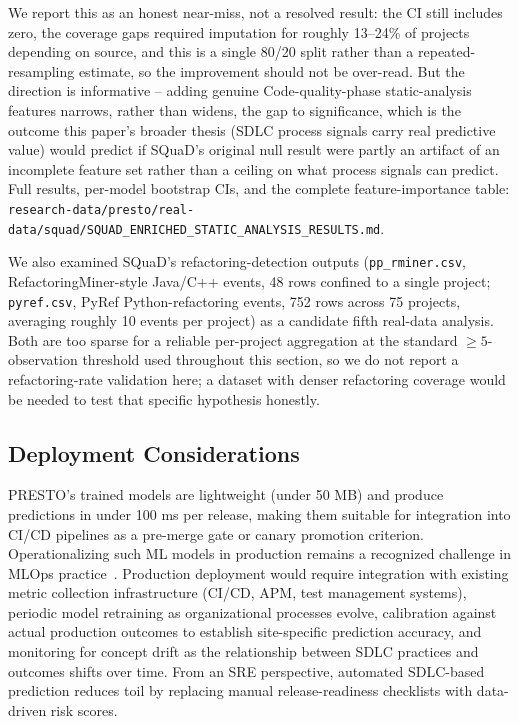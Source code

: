 \documentclass[technologies,article,submit,pdftex,moreauthors]{Definitions/mdpi}
\begin{document}
We report this as an honest near-miss, not a resolved result: the CI
still includes zero, the coverage gaps required imputation for roughly
13--24\% of projects depending on source, and this is a single 80/20
split rather than a repeated-resampling estimate, so the improvement
should not be over-read. But the direction is informative -- adding
genuine Code-quality-phase static-analysis features narrows, rather
than widens, the gap to significance, which is the outcome this paper's
broader thesis (SDLC process signals carry real predictive value) would
predict if SQuaD's original null result were partly an artifact of an
incomplete feature set rather than a ceiling on what process signals
can predict. Full results, per-model bootstrap CIs, and the complete
feature-importance table:
\texttt{research-\allowbreak data/\allowbreak presto/\allowbreak real-\allowbreak data/\allowbreak squad/\allowbreak SQUAD\_\allowbreak ENRICHED\_\allowbreak STATIC\_\allowbreak ANALYSIS\_\allowbreak RESULTS.md}.

\begin{sloppypar}
We also examined SQuaD's refactoring-detection outputs
(\texttt{pp\_rminer.csv}, RefactoringMiner-style Java/C++ events, 48
rows confined to a single project; \texttt{pyref.csv}, PyRef
Python-refactoring events, 752 rows across 75 projects, averaging
roughly 10 events per project) as a candidate fifth real-data analysis.
Both are too sparse for a reliable per-project aggregation at the
standard \(\geq 5\)-observation threshold used throughout this section,
so we do not report a refactoring-rate validation here; a dataset with
denser refactoring coverage would be needed to test that specific
hypothesis honestly.
\end{sloppypar}

\subsection{Deployment Considerations}\label{sec:deployment}

PRESTO's trained models are lightweight (under 50 MB) and produce
predictions in under 100 ms per release, making them suitable for
integration into CI/CD pipelines as a pre-merge gate or canary promotion
criterion. Operationalizing such ML models in production remains a
recognized challenge in MLOps
practice~\cite{shankar2022, diazdearcaya2024}. Production deployment
would require integration with existing metric collection infrastructure
(CI/CD, APM, test management systems), periodic model retraining as
organizational processes evolve, calibration against actual production
outcomes to establish site-specific prediction accuracy, and monitoring
for concept drift as the relationship between SDLC practices and
outcomes shifts over time. From an SRE perspective, automated SDLC-based
prediction reduces toil by replacing manual release-readiness checklists
with data-driven risk scores.
\end{document}
